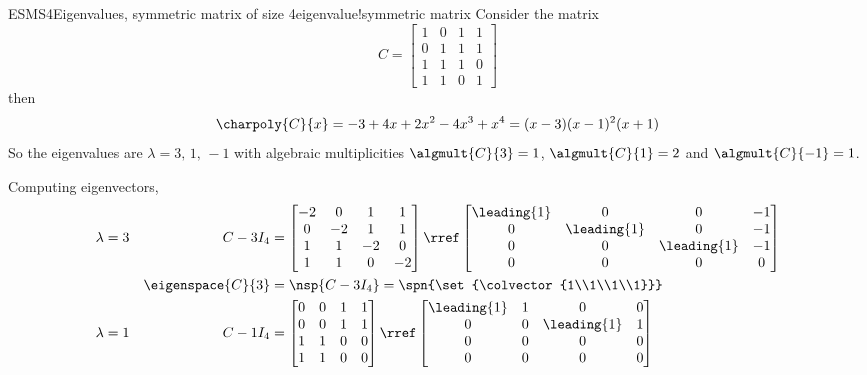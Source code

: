\begin{example}{ESMS4}{Eigenvalues, symmetric matrix of size 4}{eigenvalue!symmetric matrix}
Consider the matrix
%
\begin{equation*}
C=
\begin{bmatrix}
1 &  0 &  1 &  1\\ 
0 &  1 &  1 &  1\\ 
1 &  1 &  1 &  0\\ 
1 &  1 &  0 &  1
\end{bmatrix}
\end{equation*}
%
then
%
\begin{equation*}
\charpoly{C}{x}=-3+4x+2x^2-4x^3+x^4=(x-3)(x-1)^2(x+1)
\end{equation*}
%
So the eigenvalues are $\lambda=3,\,1,\,-1$ with algebraic multiplicities $\algmult{C}{3}=1$, $\algmult{C}{1}=2$ and $\algmult{C}{-1}=1$.\par
%
Computing eigenvectors,
%
\begin{align*}
\lambda&=3&C- 3I_4&=
\begin{bmatrix}
-2 & 0 & 1 & 1\\
0 & -2 & 1 & 1\\
1 & 1 & -2 & 0\\
1 & 1 & 0 & -2
\end{bmatrix}
\rref
\begin{bmatrix}
\leading{1} & 0 & 0 & -1\\
0 & \leading{1} & 0 & -1\\
0 & 0 & \leading{1} & -1\\
0 & 0 & 0 & 0
\end{bmatrix}\\
&&\eigenspace{C}{3}&=\nsp{C-3I_4}
=\spn{\set{\colvector{1\\1\\1\\1}}}\\
%
\lambda&=1&C-1I_4&=
\begin{bmatrix}
0 & 0 & 1 & 1\\
0 & 0 & 1 & 1\\
1 & 1 & 0 & 0\\
1 & 1 & 0 & 0
\end{bmatrix}
\rref
\begin{bmatrix}
\leading{1} & 1 & 0 & 0\\
0 & 0 & \leading{1} & 1\\
0 & 0 & 0 & 0\\
0 & 0 & 0 & 0
\end{bmatrix}\\

\end{align*}
\end{example}
